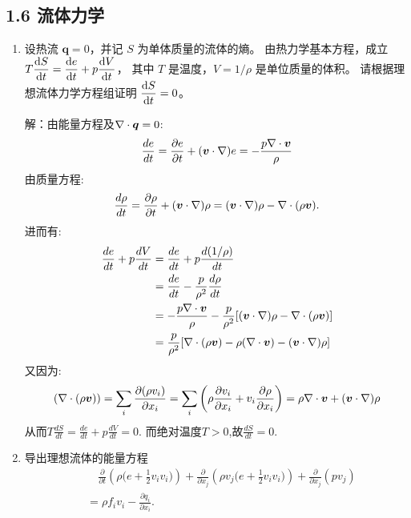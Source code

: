 \subsection{1.6 流体力学}
\begin{enumerate}
    \item 设热流 $\boldsymbol{q}=0$，并记 $S$ 为单体质量的流体的熵。
    由热力学基本方程，成立 $T \dfrac{{\rm d} S}{{\rm d} t}
    =\dfrac{{\rm d} e}{{\rm d} t}+p \dfrac{{\rm d} V}{{\rm d} t}$，
    其中 $T$ 是温度，$V=1/\rho$ 是单位质量的体积。
    请根据理想流体力学方程组证明 $\dfrac{{\rm d} S}{{\rm d} t}=0$。

    解：由能量方程及$\nabla\cdot \boldsymbol{q}=0$:
    $$\frac{de}{dt}=\frac{\partial{e}}{\partial{t}}+(\boldsymbol{v}\cdot \nabla )e=-\frac{p\nabla \cdot \boldsymbol{v}}{\rho}$$
    由质量方程:
    $$\frac{d\rho}{dt}=\frac{\partial\rho}{\partial t}+(\boldsymbol{v}\cdot\nabla)\rho=(\boldsymbol{v}\cdot\nabla)\rho-\nabla\cdot(\rho\boldsymbol{v}).$$
    进而有:
    \begin{align*}
        \frac{de}{dt}+p\frac{dV}{dt}&=\frac{de}{dt}+p\frac{d(1/\rho)}{dt}\\
        &=\frac{de}{dt}-\frac{p}{\rho^2}\frac{d\rho}{dt}\\
        &=-\frac{p\nabla \cdot \boldsymbol{v}}{\rho}-\frac{p}{\rho^2}[(\boldsymbol{v}\cdot\nabla)\rho-\nabla\cdot(\rho\boldsymbol{v})]\\
        &=\frac{p}{\rho^2}[\nabla\cdot(\rho\boldsymbol{v})-\rho(\nabla\cdot\boldsymbol{v})-(\boldsymbol{v}\cdot\nabla)\rho]
    \end{align*}
    又因为:
    $$(\nabla\cdot(\rho\boldsymbol{v}))=\sum_{i}\frac{\partial{(\rho v_i)}}{\partial{x_i}}
    =\sum_i\left({\rho \frac{\partial{v_i}}{\partial{x_i}}+v_i\frac{\partial{\rho}}{\partial{x_i}}}\right)
    =\rho\nabla\cdot\boldsymbol{v}+(\boldsymbol{v}\cdot\nabla)\rho$$
    从而$T\frac{dS}{dt}=\frac{de}{dt}+p\frac{dV}{dt}=0.$
    而绝对温度$T>0$,故$\frac{dS}{dt}=0.$

    \item 导出理想流体的能量方程
    \begin{align*}
        & \quad \frac{\partial}{\partial t}\left(\rho\big(e+\frac{1}{2} v_i v_i\big)\right)
        +\frac{\partial}{\partial x_j}\left(\rho v_j\big(e+\frac{1}{2} v_i v_i\big)\right)
        +\frac{\partial}{\partial x_j}(p v_j) \\
        & = \rho f_i v_i-\frac{\partial q_i}{\partial x_i}.
    \end{align*}


\end{enumerate}
